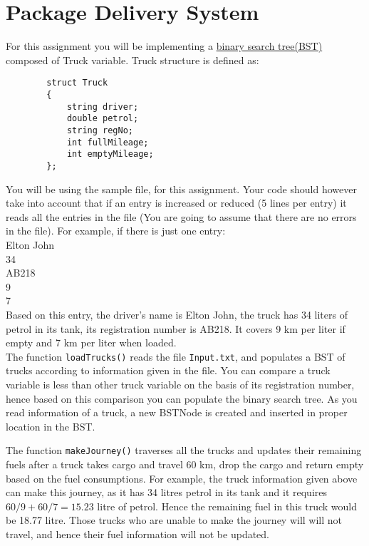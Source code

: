 \documentclass[a4paper,12pt]{article}
\begin{document}
	
	\section{Package Delivery System}
	For this assignment you will be implementing a \href{https://www.javatpoint.com/binary-search-tree}{binary search tree(BST)} composed of Truck variable. Truck structure is defined as:

	\begin{lstlisting}
		struct Truck
		{
		    string driver;
		    double petrol;
		    string regNo;
		    int fullMileage;
		    int emptyMileage;
		};
	\end{lstlisting}

You will be using the sample file,  for this assignment. Your code should however take into account that if an entry is increased or reduced (5 lines per entry) it reads all the entries in the file (You are going to assume that there are no errors in the file). For example, if there is just one entry:\smallskip\\
	
	\noindent Elton John\\
	34\\
	AB218\\
	9\\
	7\\
	
	

	\noindent Based on this entry, the driver's name is Elton John, the truck has 34 liters of petrol in its tank, its registration number is AB218. It covers 9 km per liter if empty and 7 km per liter when loaded.\\
	
	\noindent The function \texttt{loadTrucks()} reads the file \texttt{Input.txt}, and populates a BST of trucks according to information given in the file. You can compare a truck variable is less than other truck variable on the basis of its registration number, hence based on this comparison you can populate the binary search tree. As you read information of a truck, a new BSTNode is created and inserted in proper location in the BST. 
	
	\noindent The function \texttt{makeJourney()} traverses all the trucks and updates their remaining fuels after a truck takes cargo and travel 60 km, drop the cargo and return empty based on the fuel consumptions. For example, the truck information given above can make this journey, as it has 34 litres petrol in its tank and it requires  $60/9 + 60/7 = 15.23$ litre of petrol. Hence the remaining fuel in this truck would be 18.77 litre. Those trucks who are unable to make the journey will will not travel, and hence their fuel information will not be updated. \\
\end{document}
